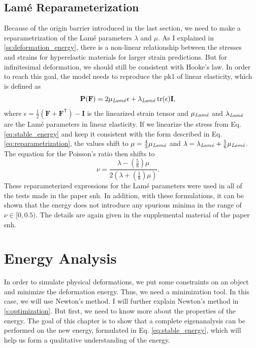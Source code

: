 {{{\subsection{Lamé Reparameterization}
Because of the origin barrier introduced in the last section, we need to make a reparametrization of the Lamé parameters $\lambda$ and $\mu$. As I explained in \autoref{ss:deformation_energy}, there is a non-linear relationship between the stresses and strains for hyperelastic materials for larger strain predictions. But for infinitesimal deformation, we should still be consistent with Hooke's law. In order to reach this goal, the model needs to reproduce the \acrshort{pk1} of linear elasticity, which is defined as
\begin{equation} \label{eq:reparametrization}
	\mathbf{P}(\mathbf{F}) = 2 \mu_{\text{\textit{Lamé}}} \epsilon + \lambda_{\text{\textit{Lamé}}} \operatorname{tr}(\epsilon) \mathbf{I},
\end{equation}
where $\epsilon = \frac{1}{2} (\mathbf{F} + \mathbf{F}^\mathsf{T}) - \mathbf{I}$ is the linearized strain tensor and $\mu_{\text{\textit{Lamé}}}$ and $\lambda_{\text{\textit{Lamé}}}$ are the Lamé parameters in linear elasticity. If we linearize the stress from Eq. \eqref{eq:stable_energy} and keep it consistent with the form described in Eq. \eqref{eq:reparametrization}, the values shift to $\mu = \frac{4}{3} \mu_{\text{\textit{Lamé}}}$ and $\lambda = \lambda_{\text{\textit{Lamé}}} + \frac{5}{6} \mu_{\text{\textit{Lamé}}}$. The equation for the Poisson's ratio then shifts to 
\[
	\nu = \frac{\lambda - \left( \frac{5}{8} \right) \mu}{2 \left(\lambda + \left( \frac{1}{8} \right) \mu  \right)}.
\]
These reparameterized expressions for the Lamé parameters were used in all of the tests made in the paper \acrshort{snh}. In addition, with these formulations, it can be shown that the energy does not introduce any spurious minima in the range of $\nu \in [0, 0.5)$. The details are again given in the supplemental material of the paper \acrshort{snh}.

\section{Energy Analysis}
In order to simulate physical deformations, we put some constraints on an object and minimize the deformation energy. Thus, we need a minimization tool. In this case, we will use Newton's method. I will further explain Newton's method in \autoref{s:optimization}. But first, we need to know more about the properties of the energy. The goal of this chapter is to show that a complete eigenanalysis can be performed on the new energy, formulated in Eq. \eqref{eq:stable_energy}, which will help us form a qualitative understanding of the energy.

}}}
